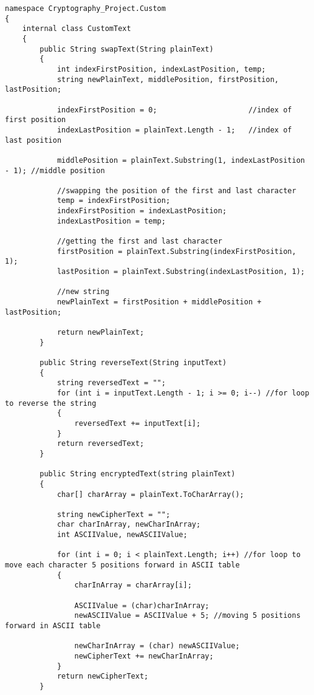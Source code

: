 \begin{lstlisting}[caption=B\&G Cipher Text Source Code]
namespace Cryptography_Project.Custom
{
    internal class CustomText
    {
        public String swapText(String plainText)
        {
            int indexFirstPosition, indexLastPosition, temp;
            string newPlainText, middlePosition, firstPosition, lastPosition;

            indexFirstPosition = 0;                     //index of first position
            indexLastPosition = plainText.Length - 1;   //index of last position

            middlePosition = plainText.Substring(1, indexLastPosition - 1); //middle position

            //swapping the position of the first and last character
            temp = indexFirstPosition;                  
            indexFirstPosition = indexLastPosition;     
            indexLastPosition = temp;

            //getting the first and last character
            firstPosition = plainText.Substring(indexFirstPosition, 1); 
            lastPosition = plainText.Substring(indexLastPosition, 1);

            //new string
            newPlainText = firstPosition + middlePosition + lastPosition;

            return newPlainText;
        }

        public String reverseText(String inputText)
        {
            string reversedText = "";
            for (int i = inputText.Length - 1; i >= 0; i--) //for loop to reverse the string
            {
                reversedText += inputText[i];
            }
            return reversedText;
        }

        public String encryptedText(string plainText)
        {
            char[] charArray = plainText.ToCharArray();

            string newCipherText = "";
            char charInArray, newCharInArray;
            int ASCIIValue, newASCIIValue;

            for (int i = 0; i < plainText.Length; i++) //for loop to move each character 5 positions forward in ASCII table
            {
                charInArray = charArray[i];

                ASCIIValue = (char)charInArray;
                newASCIIValue = ASCIIValue + 5; //moving 5 positions forward in ASCII table

                newCharInArray = (char) newASCIIValue;
                newCipherText += newCharInArray;
            }
            return newCipherText;
        }


\end{lstlisting}
